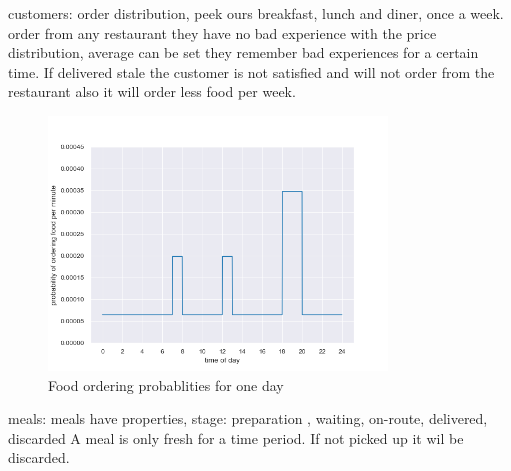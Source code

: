 customers:
order distribution, peek ours breakfast, lunch and  diner, once a week.
order from any restaurant they have no bad experience with
the price distribution, average can be set
they remember bad experiences for a certain time.
If delivered stale the customer is not satisfied and will not order from the restaurant also
it will order less food per week.

\begin{figure}
    \centering
    \includegraphics[width=9cm]{sections/pics/food_ordering_distribution}
    \caption{Food ordering probablities for one day}
    \label{fig:food_ordering_distribution}
\end{figure}



meals:
meals have properties, stage: preparation , waiting, on-route, delivered, discarded
A meal is only fresh for a time period.
If not picked up it wil be discarded.





